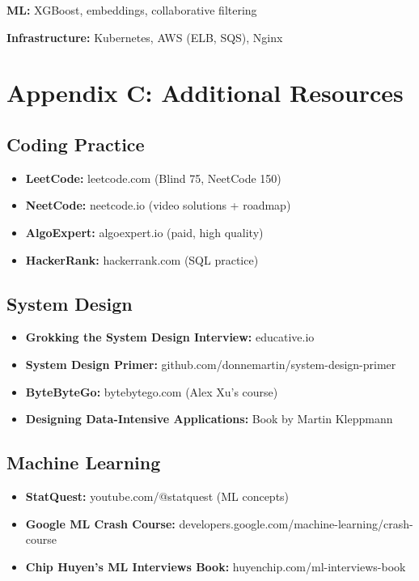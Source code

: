 \documentclass[11pt,letterpaper]{article}
\begin{document}
\textbf{ML:} XGBoost, embeddings, collaborative filtering

\textbf{Infrastructure:} Kubernetes, AWS (ELB, SQS), Nginx

\section{Appendix C: Additional Resources}

\subsection{Coding Practice}

\begin{itemize}
    \item \textbf{LeetCode:} leetcode.com (Blind 75, NeetCode 150)
    \item \textbf{NeetCode:} neetcode.io (video solutions + roadmap)
    \item \textbf{AlgoExpert:} algoexpert.io (paid, high quality)
    \item \textbf{HackerRank:} hackerrank.com (SQL practice)
\end{itemize}

\subsection{System Design}

\begin{itemize}
    \item \textbf{Grokking the System Design Interview:} educative.io
    \item \textbf{System Design Primer:} github.com/donnemartin/system-design-primer
    \item \textbf{ByteByteGo:} bytebytego.com (Alex Xu's course)
    \item \textbf{Designing Data-Intensive Applications:} Book by Martin Kleppmann
\end{itemize}

\subsection{Machine Learning}

\begin{itemize}
    \item \textbf{StatQuest:} youtube.com/@statquest (ML concepts)
    \item \textbf{Google ML Crash Course:} developers.google.com/machine-learning/crash-course
    \item \textbf{Chip Huyen's ML Interviews Book:} huyenchip.com/ml-interviews-book
\end{itemize}
\end{document}
